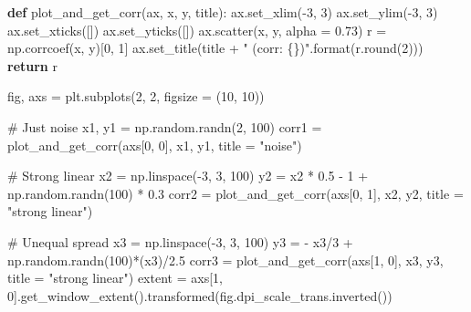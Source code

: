\documentclass[
  letterpaper,
  DIV=11,
  numbers=noendperiod]{scrreprt}
\newenvironment{Shaded}{\begin{snugshade}}{\end{snugshade}}
\newcommand{\BuiltInTok}[1]{\textcolor[rgb]{0.00,0.23,0.31}{#1}}
\newcommand{\CommentTok}[1]{\textcolor[rgb]{0.37,0.37,0.37}{#1}}
\newcommand{\ControlFlowTok}[1]{\textcolor[rgb]{0.00,0.23,0.31}{\textbf{#1}}}
\newcommand{\DecValTok}[1]{\textcolor[rgb]{0.68,0.00,0.00}{#1}}
\newcommand{\FloatTok}[1]{\textcolor[rgb]{0.68,0.00,0.00}{#1}}
\newcommand{\KeywordTok}[1]{\textcolor[rgb]{0.00,0.23,0.31}{\textbf{#1}}}
\newcommand{\NormalTok}[1]{\textcolor[rgb]{0.00,0.23,0.31}{#1}}
\newcommand{\OperatorTok}[1]{\textcolor[rgb]{0.37,0.37,0.37}{#1}}
\newcommand{\SpecialCharTok}[1]{\textcolor[rgb]{0.37,0.37,0.37}{#1}}
\newcommand{\StringTok}[1]{\textcolor[rgb]{0.13,0.47,0.30}{#1}}
\begin{document}
\begin{Shaded}
\begin{Highlighting}[]
\KeywordTok{def}\NormalTok{ plot\_and\_get\_corr(ax, x, y, title):}
\NormalTok{    ax.set\_xlim(}\OperatorTok{{-}}\DecValTok{3}\NormalTok{, }\DecValTok{3}\NormalTok{)}
\NormalTok{    ax.set\_ylim(}\OperatorTok{{-}}\DecValTok{3}\NormalTok{, }\DecValTok{3}\NormalTok{)}
\NormalTok{    ax.set\_xticks([])}
\NormalTok{    ax.set\_yticks([])}
\NormalTok{    ax.scatter(x, y, alpha }\OperatorTok{=} \FloatTok{0.73}\NormalTok{)}
\NormalTok{    r }\OperatorTok{=}\NormalTok{ np.corrcoef(x, y)[}\DecValTok{0}\NormalTok{, }\DecValTok{1}\NormalTok{]}
\NormalTok{    ax.set\_title(title }\OperatorTok{+} \StringTok{" (corr: }\SpecialCharTok{\{\}}\StringTok{)"}\NormalTok{.}\BuiltInTok{format}\NormalTok{(r.}\BuiltInTok{round}\NormalTok{(}\DecValTok{2}\NormalTok{)))}
    \ControlFlowTok{return}\NormalTok{ r}

\NormalTok{fig, axs }\OperatorTok{=}\NormalTok{ plt.subplots(}\DecValTok{2}\NormalTok{, }\DecValTok{2}\NormalTok{, figsize }\OperatorTok{=}\NormalTok{ (}\DecValTok{10}\NormalTok{, }\DecValTok{10}\NormalTok{))}

\CommentTok{\# Just noise}
\NormalTok{x1, y1 }\OperatorTok{=}\NormalTok{ np.random.randn(}\DecValTok{2}\NormalTok{, }\DecValTok{100}\NormalTok{)}
\NormalTok{corr1 }\OperatorTok{=}\NormalTok{ plot\_and\_get\_corr(axs[}\DecValTok{0}\NormalTok{, }\DecValTok{0}\NormalTok{], x1, y1, title }\OperatorTok{=} \StringTok{"noise"}\NormalTok{)}

\CommentTok{\# Strong linear}
\NormalTok{x2 }\OperatorTok{=}\NormalTok{ np.linspace(}\OperatorTok{{-}}\DecValTok{3}\NormalTok{, }\DecValTok{3}\NormalTok{, }\DecValTok{100}\NormalTok{)}
\NormalTok{y2 }\OperatorTok{=}\NormalTok{ x2 }\OperatorTok{*} \FloatTok{0.5} \OperatorTok{{-}} \DecValTok{1} \OperatorTok{+}\NormalTok{ np.random.randn(}\DecValTok{100}\NormalTok{) }\OperatorTok{*} \FloatTok{0.3}
\NormalTok{corr2 }\OperatorTok{=}\NormalTok{ plot\_and\_get\_corr(axs[}\DecValTok{0}\NormalTok{, }\DecValTok{1}\NormalTok{], x2, y2, title }\OperatorTok{=} \StringTok{"strong linear"}\NormalTok{)}

\CommentTok{\# Unequal spread}
\NormalTok{x3 }\OperatorTok{=}\NormalTok{ np.linspace(}\OperatorTok{{-}}\DecValTok{3}\NormalTok{, }\DecValTok{3}\NormalTok{, }\DecValTok{100}\NormalTok{)}
\NormalTok{y3 }\OperatorTok{=} \OperatorTok{{-}}\NormalTok{ x3}\OperatorTok{/}\DecValTok{3} \OperatorTok{+}\NormalTok{ np.random.randn(}\DecValTok{100}\NormalTok{)}\OperatorTok{*}\NormalTok{(x3)}\OperatorTok{/}\FloatTok{2.5}
\NormalTok{corr3 }\OperatorTok{=}\NormalTok{ plot\_and\_get\_corr(axs[}\DecValTok{1}\NormalTok{, }\DecValTok{0}\NormalTok{], x3, y3, title }\OperatorTok{=} \StringTok{"strong linear"}\NormalTok{)}
\NormalTok{extent }\OperatorTok{=}\NormalTok{ axs[}\DecValTok{1}\NormalTok{, }\DecValTok{0}\NormalTok{].get\_window\_extent().transformed(fig.dpi\_scale\_trans.inverted())}


\end{Highlighting}
\end{Shaded}
\end{document}
